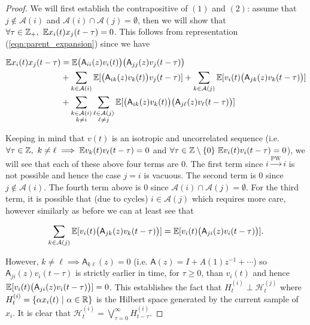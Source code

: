 \documentclass[12pt]{article}
\def\pwgc{\overset{\text{PW}}{\rightarrow}}  %
\def\A{\mathsf{A}}  %
\def\H{\mathcal{H}}  %
\newcommand{\anc}[1]{\mathcal{A}(#1)}  %
\begin{document}
\begin{proof}
  We will first establish the contrapositive of $(1)$ and $(2)$: assume that $j \not \in \anc{i}$ and $\anc{i} \cap \anc{j} = \emptyset$, then we will show that $\forall \tau \in \mathbb{Z}_+,\ \mathbb{E} x_i(t)x_j(t - \tau) = 0$.  This follows from representation (\ref{eqn:parent_expansion}) since we have

  \begin{align*}
    \E x_i(t)x_j(t - \tau) &= \E \big(\A_{ii}(z)v_i(t)\big)\big(\A_{jj}(z)v_j(t - \tau)\big)\\
    &+ \sum_{k \in \anc{i}}\E[\big(\A_{ik}(z)v_k(t)\big)v_j(t - \tau)] + \sum_{k \in \anc{j}}\E[v_i(t) \big(\A_{jk}(z) v_k(t - \tau)\big)]\\
    &+ \sum_{\substack{k \in \anc{i} \\ k \ne i}}\sum_{\substack{\ell \in \anc{j} \\ \ell \ne j}}\E[\big(\A_{ik}(z)v_k(t)\big)\big(\A_{j\ell}(z)v_\ell(t - \tau)\big)]\\
  \end{align*}

  Keeping in mind that $v(t)$ is an isotropic and uncorrelated sequence (i.e. $\forall \tau \in \mathbb{Z},\ k \ne \ell \implies \mathbb{E} v_k(t)v_\ell(t - \tau) = 0$ and $\forall \tau \in \mathbb{Z}\setminus\{0\}\ \mathbb{E} v_i(t)v_i(t - \tau) = 0$), we will see that each of these above four terms are 0.  The first term since $i \pwgc i$ is not possible and hence the case $j = i$ is vacuous.  The second term is 0 since $j \not\in \anc{i}$.  The fourth term above is 0 since $\anc{i} \cap \anc{j} = \emptyset$.  For the third term, it is possible that (due to cycles) $i \in \anc{j}$ which requires more care, however similarly as before we can at least see that

  \begin{equation*}
    \sum_{k \in \anc{j}}\E[v_i(t) \big(\A_{jk}(z) v_k(t - \tau)\big)] = \E[v_i(t)\big(\A_{ji}(z)v_i(t - \tau)\big)].
  \end{equation*}

  However, $k \ne \ell \implies \A_{k\ell}(z) = 0$ (i.e. $\A(z) = I + A(1)z^{-1} + \cdots$) so $\A_{ji}(z)v_i(t - \tau)$ is strictly earlier in time, for $\tau \ge 0$, than $v_i(t)$ and hence $\E[v_i(t)\big(\A_{ji}(z)v_i(t - \tau)\big)] = 0$.  This establishes the fact that $H_t^{(i)} \perp \H_t^{(j)}$ where $H_t^{(i)} = \{\alpha x_i(t)\ |\ \alpha \in \mathbb{R}\}$ is the Hilbert space generated by the current sample of $x_i$.  It is clear that $\H_t^{(i)} = \bigvee_{\tau = 0}^\infty H_{t - \tau}^{(i)}$.


\end{proof}
\end{document}
